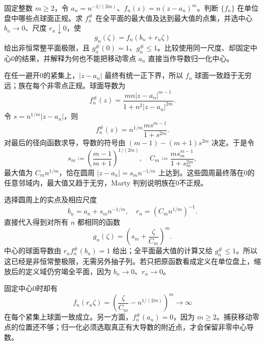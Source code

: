 \begin{exercise}[零点附近的导数峰值与重缩放]\label{b3:ex:14-4}
固定整数 \(m\ge2\)，令 \(a_n=n^{-1/(2m)}\)、\(f_n(z)=n(z-a_n)^m\)。判断 \(\{f_n\}\) 在单位盘中哪些点球面正规。求 \(f_n^\#\) 在全平面的最大值及达到最大值的点集，并选中心 \(b_n\rightarrow0\)、尺度 \(r_n\downarrow0\)，使
\[
 g_n(\zeta)=f_n(b_n+r_n\zeta)
\]
给出非恒常整平面极限，且 \(g_n^\#(0)=1\)、\(g_n^\#\le1\)。比较使用同一尺度、却固定中心0的结果，并解释为何也不能把移动零点 \(a_n\) 直接当作导数归一化中心。
\end{exercise}
\begin{solution}
在任一避开0的紧集上，\(|z-a_n|\) 最终有统一正下界，所以 \(f_n\) 球面一致趋于无穷远；族在每个非零点正规。球面导数为
\[
 f_n^\#(z)=\frac{mn|z-a_n|^{m-1}}{1+n^2|z-a_n|^{2m}}.
\]
令 \(s=n^{1/m}|z-a_n|\)，则
\[
 f_n^\#(z)=n^{1/m}\frac{m s^{m-1}}{1+s^{2m}}.
\]
对最后的径向函数求导，导数的符号由 \((m-1)-(m+1)s^{2m}\) 决定。于是令
\[
 s_m\coloneqq\left(\frac{m-1}{m+1}\right)^{1/(2m)},\quad
 C_m\coloneqq\frac{m s_m^{m-1}}{1+s_m^{2m}},
\]
最大值为 \(C_m n^{1/m}\)，恰在圆周 \(|z-a_n|=s_m n^{-1/m}\) 上达到。这些圆周最终落在0的任意邻域内，最大值又趋于无穷，Marty 判别说明族在0不正规。

选择圆周上的实点及相应尺度
\[
 b_n=a_n+s_m n^{-1/m},\quad
 r_n=(C_m n^{1/m})^{-1}.
\]
直接代入得到对所有 \(n\) 都相同的函数
\[
 g_n(\zeta)=\left(s_m+\frac\zeta{C_m}\right)^m.
\]
中心的球面导数由 \(r_nf_n^\#(b_n)=1\) 给出；全平面最大值的计算又给 \(g_n^\#\le1\)。所以这已经是非恒常整极限，无需另外抽子列。若只把原函数看成定义在单位盘上，缩放后的定义域仍穷竭全平面，因为 \(b_n\rightarrow0\)、\(r_n\rightarrow0\)。

固定中心0时却有
\[
 f_n(r_n\zeta)
 =\left(\frac\zeta{C_m}-n^{1/(2m)}\right)^m
 \longrightarrow\infty
\]
在每个紧集上球面一致成立。另一方面，\(f_n^\#(a_n)=0\)，因为 \(m\ge2\)。捕获移动零点的位置还不够；归一化必须选取真正有大导数的附近点，才会保留非零中心导数。
\end{solution}

